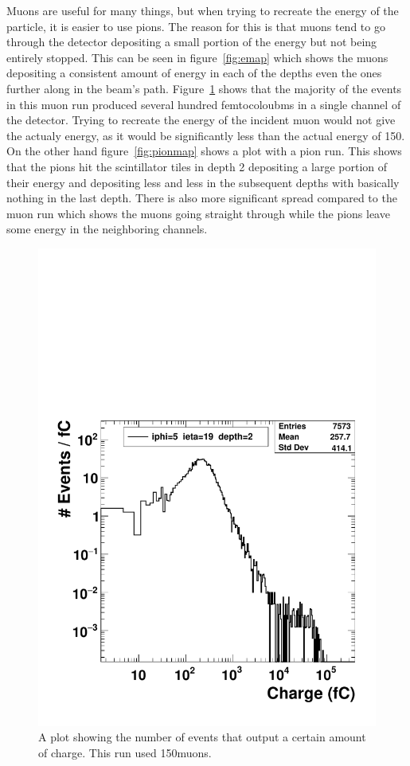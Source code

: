 Muons are useful for many things, but when trying to recreate the energy of the particle, it is easier to use pions. The reason for this is that muons tend to go through the detector depositing a small portion of the energy but not being entirely stopped. This can be seen in figure~\ref{fig:emap} which shows the muons depositing a consistent amount of energy in each of the depths even the ones further along in the beam's path. Figure~\ref{fig:Muon} shows that the majority of the events in this muon run produced several hundred femtocoloubms in a single channel of the detector. Trying to recreate the energy of the incident muon would not give the actualy energy, as it would be significantly less than the actual energy of 150\GeV. On the other hand figure~\ref{fig:pionmap} shows a plot with a pion run. This shows that the pions hit the scintillator tiles in depth 2 depositing a large portion of their energy and depositing less and less in the subsequent depths with basically nothing in the last depth. There is also more significant spread compared to the muon run which shows the muons going straight through while the pions leave some energy in the neighboring channels.

\begin{figure}
\centering
\includegraphics[width=0.7\linewidth]{Figures/MuonCharge.pdf}
\caption{A plot showing the number of events that output a certain amount of charge. This run used 150\GeV\space muons.}
\label{fig:Muon}
\end{figure}

